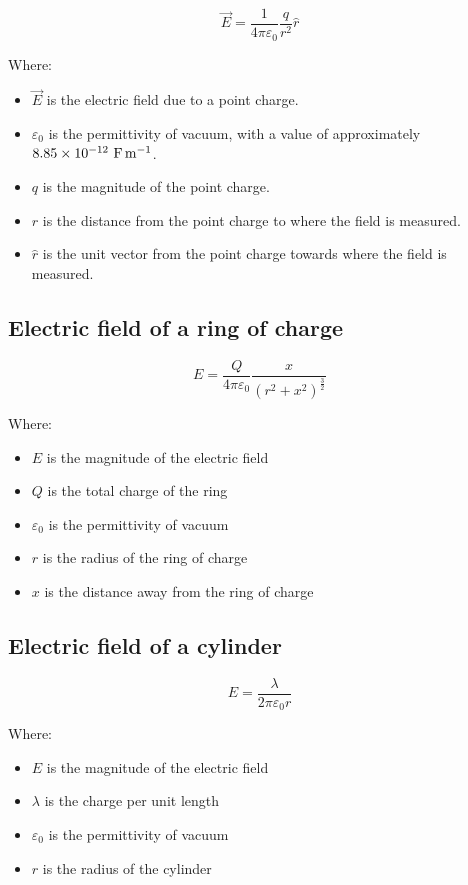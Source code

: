 \documentclass[11pt]{article}
\begin{document}
\[\vec{E} = \frac{1}{4 \pi \varepsilon_0} \frac{q}{r^2} \hat{r}\]

Where:
\begin{itemize}
\item \(\vec{E}\) is the electric field due to a point charge.
\item \(\varepsilon_0\) is the permittivity of vacuum, with a value of approximately \(\\ 8.85 \times 10^{-12} \ \unit{F.m^{-1}}\).
\item \(q\) is the magnitude of the point charge.
\item \(r\) is the distance from the point charge to where the field is measured.
\item \(\hat{r}\) is the unit vector from the point charge towards where the field is measured.
\end{itemize}
\subsection{Electric field of a ring of charge}
\label{sec:org2f6ff74}
\[E = \frac{Q}{4 \pi \varepsilon_0} \frac{x}{(r^2 + x^2)^{\frac{3}{2}}}\]

Where:
\begin{itemize}
\item \(E\) is the magnitude of the electric field
\item \(Q\) is the total charge of the ring
\item \(\varepsilon_0\) is the permittivity of vacuum
\item \(r\) is the radius of the ring of charge
\item \(x\) is the distance away from the ring of charge
\end{itemize}

\newpage
\subsection{Electric field of a cylinder}
\label{sec:orgf2ba336}
\[E = \frac{\lambda}{2 \pi \varepsilon_0 r}\]

Where:
\begin{itemize}
\item \(E\) is the magnitude of the electric field
\item \(\lambda\) is the charge per unit length
\item \(\varepsilon_0\) is the permittivity of vacuum
\item \(r\) is the radius of the cylinder
\end{itemize}
\end{document}

